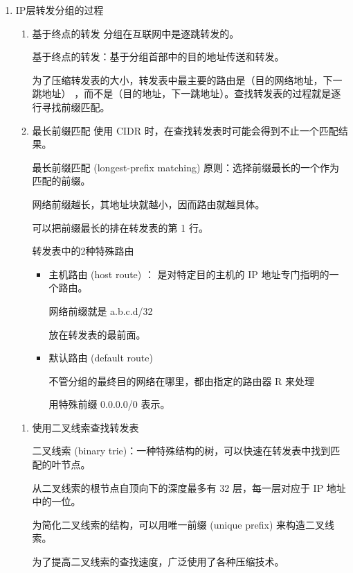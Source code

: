 \documentclass[11pt]{article}
\begin{document}
\begin{enumerate}
首部检验和——占 16 位，只检验数据报的首部，不检验数据部分。这里不采用 CRC 检验码而采用简单的计算方法。 

\item IP层转发分组的过程
\label{sec:org1811da2}

\begin{enumerate}
\item 基于终点的转发
分组在互联网中是逐跳转发的。

基于终点的转发：基于分组首部中的目的地址传送和转发。

为了压缩转发表的大小，转发表中最主要的路由是（目的网络地址，下一跳地址） ，而不是（目的地址，下一跳地址）。查找转发表的过程就是逐行寻找前缀匹配。

\item 最长前缀匹配
使用 CIDR 时，在查找转发表时可能会得到不止一个匹配结果。 

最长前缀匹配 (longest-prefix matching) 原则：选择前缀最长的一个作为匹配的前缀。

网络前缀越长，其地址块就越小，因而路由就越具体。

可以把前缀最长的排在转发表的第 1 行。

转发表中的2种特殊路由
\begin{itemize}
\item 主机路由 (host route) ：
是对特定目的主机的 IP 地址专门指明的一个路由。

网络前缀就是 a.b.c.d/32

放在转发表的最前面。

\item 默认路由 (default route)

不管分组的最终目的网络在哪里，都由指定的路由器 R 来处理

用特殊前缀 0.0.0.0/0 表示。
\end{itemize}
\end{enumerate}


\begin{enumerate}
\item 使用二叉线索查找转发表

二叉线索 (binary trie)：一种特殊结构的树，可以快速在转发表中找到匹配的叶节点。

从二叉线索的根节点自顶向下的深度最多有 32 层，每一层对应于 IP 地址中的一位。

为简化二叉线索的结构，可以用唯一前缀 (unique prefix) 来构造二叉线索。

为了提高二叉线索的查找速度，广泛使用了各种压缩技术。
\end{enumerate}


\end{enumerate}
\end{document}
